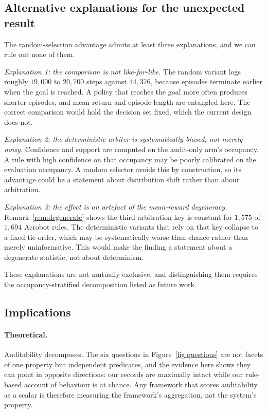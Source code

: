 \documentclass[11pt,a4paper]{article}
\begin{document}
\subsection{Alternative explanations for the unexpected result}

The random-selection advantage admits at least three explanations, and we can rule out none of them.

\emph{Explanation 1: the comparison is not like-for-like.} The random variant logs roughly $19{,}000$ to $20{,}700$ steps against $44{,}376$, because episodes terminate earlier when the goal is reached. A policy that reaches the goal more often produces shorter episodes, and mean return and episode length are entangled here. The correct comparison would hold the decision set fixed, which the current design does not.

\emph{Explanation 2: the deterministic arbiter is systematically biased, not merely noisy.} Confidence and support are computed on the audit-only arm's occupancy. A rule with high confidence on that occupancy may be poorly calibrated on the evaluation occupancy. A random selector avoids this by construction, so its advantage could be a statement about distribution shift rather than about arbitration.

\emph{Explanation 3: the effect is an artefact of the mean-reward degeneracy.} Remark~\ref{rem:degenerate} shows the third arbitration key is constant for $1{,}575$ of $1{,}694$ Acrobot rules. The deterministic variants that rely on that key collapse to a fixed tie order, which may be systematically worse than chance rather than merely uninformative. This would make the finding a statement about a degenerate statistic, not about determinism.

These explanations are not mutually exclusive, and distinguishing them requires the occupancy-stratified decomposition listed as future work.

\subsection{Implications}

\paragraph{Theoretical.} Auditability decomposes. The six questions in Figure~\ref{fig:questions} are not facets of one property but independent predicates, and the evidence here shows they can point in opposite directions: our records are maximally intact while our rule-based account of behaviour is at chance. Any framework that scores auditability as a scalar is therefore measuring the framework's aggregation, not the system's property.
\end{document}
